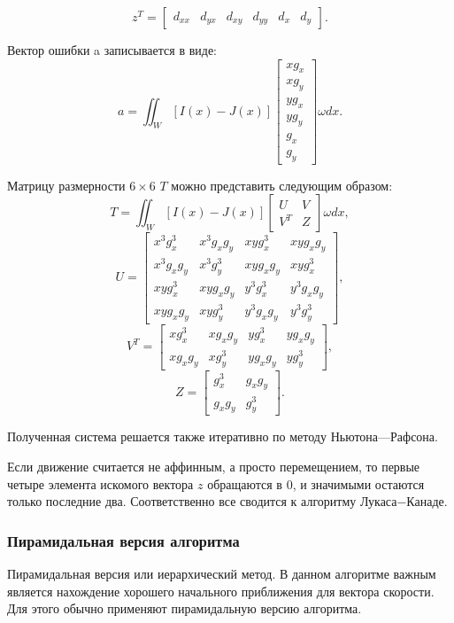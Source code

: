 $$z^T=\begin{bmatrix}
 d_{xx} & d_{yx} & d_{xy} & d_{yy} & d_x & d_y
\end{bmatrix}.$$

Вектор ошибки a записывается в виде:
$$a=\iint_W [I(x)-J(x)]\begin{bmatrix}
xg_x\\
xg_y\\
yg_x\\
yg_y\\
g_x\\
g_y
\end{bmatrix}\omega dx.$$

Матрицу размерности $6 \times 6$ $T$ можно представить следующим образом:
$$T=\iint_W [I(x)-J(x)]\begin{bmatrix}
U & V\\
V^T & Z
\end{bmatrix}\omega dx,$$
$$U=\begin{bmatrix}
x^3 g^3_x & x^3 g_x g_y & x y g^3_x & x y g_x g_y \\
x^3g_xg_y & x^3g^3_y & xyg_xg_y & xyg^3_x \\
xyg^3_x & xyg_xg_y & y^3g^3_x & y^3g_xg_y \\
xyg_xg_y & xyg^3_y & y^3g_xg_y & y^3g^3_y
\end{bmatrix},$$
$$V^T=\begin{bmatrix}
xg^3_x & xg_xg_y & yg^3_x & yg_xg_y \\
xg_xg_y & xg^3_y & yg_xg_y & yg^3_y
\end{bmatrix},$$
$$Z=\begin{bmatrix}
g^3_x & g_xg_y \\
g_xg_y & g^3_y
\end{bmatrix}.$$

Полученная система решается также итеративно по методу Ньютона—Рафсона.

Если движение считается не аффинным, а просто перемещением, то первые четыре элемента искомого вектора $z$ обращаются в 0, и значимыми остаются только последние два. Соответственно все сводится к алгоритму Лукаса−Канаде.
\subsubsection{Пирамидальная версия алгоритма}
\label{subsec:pyramid}
Пирамидальная версия или иерархический метод. В данном алгоритме важным является нахождение хорошего начального приближения для вектора скорости. Для этого обычно применяют пирамидальную версию алгоритма.

